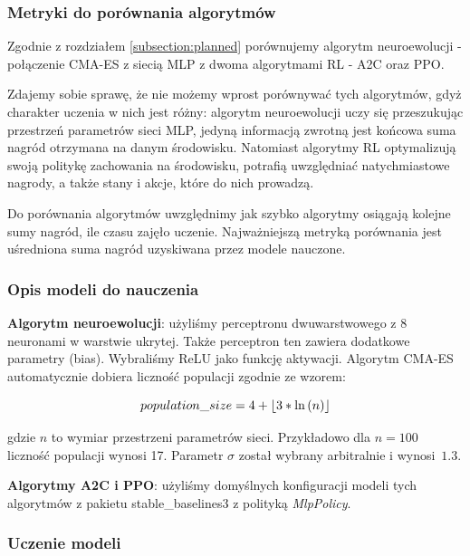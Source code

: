 \documentclass[12pt,a4paper]{article}
\DeclarePairedDelimiter\floor{\lfloor}{\rfloor}
\begin{document}
\subsubsection{Metryki do porównania algorytmów}

Zgodnie z rozdziałem \ref{subsection:planned} porównujemy
algorytm neuroewolucji - połączenie CMA-ES z siecią MLP z dwoma algorytmami
RL - A2C oraz PPO.

Zdajemy sobie sprawę, że nie możemy wprost porównywać tych algorytmów, gdyż
charakter uczenia w nich jest różny: algorytm neuroewolucji uczy się
przeszukując przestrzeń parametrów sieci MLP, jedyną informacją zwrotną jest
końcowa suma nagród otrzymana na danym środowisku. Natomiast algorytmy
RL optymalizują swoją politykę zachowania na środowisku, potrafią
uwzględniać natychmiastowe nagrody, a także stany i akcje, które do nich
prowadzą.

Do porównania algorytmów uwzględnimy jak szybko algorytmy osiągają
kolejne sumy nagród, ile czasu zajęło uczenie. Najważniejszą metryką
porównania jest uśredniona suma nagród uzyskiwana  przez modele nauczone.

\subsubsection{Opis modeli do nauczenia}

\textbf{Algorytm neuroewolucji}: użyliśmy perceptronu
dwuwarstwowego z 8 neuronami w warstwie ukrytej. Także perceptron ten
zawiera dodatkowe parametry (bias). Wybraliśmy ReLU jako funkcję aktywacji.
Algorytm \mbox{CMA-ES} automatycznie dobiera liczność populacji zgodnie
ze wzorem:

\begin{equation*}
  population\_size = 4 + \floor{3 * \ln{(n)} }
\end{equation*}

gdzie $n$ to wymiar przestrzeni parametrów sieci. Przykładowo
dla $ n = 100 $ liczność populacji wynosi 17. Parametr $\sigma$
został wybrany arbitralnie i \mbox{wynosi $1.3$}.

\bigskip

\noindent\textbf{Algorytmy A2C i PPO}: użyliśmy domyślnych konfiguracji
modeli tych algorytmów z pakietu stable\_baselines3 z polityką
\emph{MlpPolicy}.

\subsubsection{Uczenie modeli}
\end{document}
